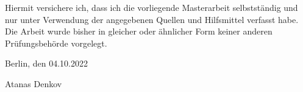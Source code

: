 
Hiermit versichere ich, dass ich die vorliegende Masterarbeit selbstständig und nur unter Verwendung der angegebenen Quellen und Hilfsmittel verfasst habe. Die Arbeit wurde bisher in gleicher oder ähnlicher Form keiner anderen Prüfungsbehörde vorgelegt.

\vskip 1cm

Berlin, den 04.10.2022

\vskip 1.5cm

Atanas Denkov
